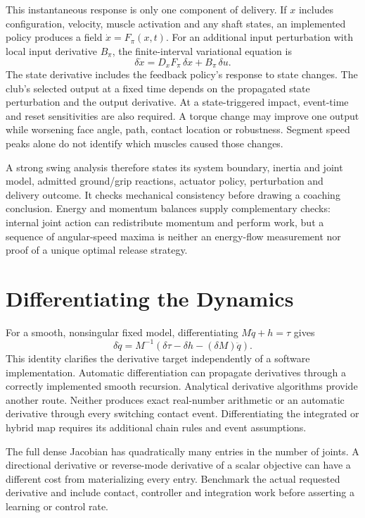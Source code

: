 This instantaneous response is only one component of delivery. If $x$ includes configuration, velocity, muscle activation and any shaft states, an implemented policy produces a field $\dot x=F_\pi(x,t)$. For an additional input perturbation with local input derivative $B_\pi$, the finite-interval variational equation is
\begin{equation}
 \delta\dot x=D_xF_\pi\,\delta x+B_\pi\,\delta u.
\end{equation}
The state derivative includes the feedback policy's response to state changes. The club's selected output at a fixed time depends on the propagated state perturbation and the output derivative. At a state-triggered impact, event-time and reset sensitivities are also required. A torque change may improve one output while worsening face angle, path, contact location or robustness. Segment speed peaks alone do not identify which muscles caused those changes.

A strong swing analysis therefore states its system boundary, inertia and joint model, admitted ground/grip reactions, actuator policy, perturbation and delivery outcome. It checks mechanical consistency before drawing a coaching conclusion. Energy and momentum balances supply complementary checks: internal joint action can redistribute momentum and perform work, but a sequence of angular-speed maxima is neither an energy-flow measurement nor proof of a unique optimal release strategy.

\section{Differentiating the Dynamics}

For a smooth, nonsingular fixed model, differentiating $M\ddot q+h=\tau$ gives
\begin{equation}
 \delta\ddot q=M^{-1}
 \left(\delta\tau-\delta h-(\delta M)\ddot q\right).
\end{equation}
This identity clarifies the derivative target independently of a software implementation. Automatic differentiation can propagate derivatives through a correctly implemented smooth recursion. Analytical derivative algorithms provide another route. Neither produces exact real-number arithmetic or an automatic derivative through every switching contact event. Differentiating the integrated or hybrid map requires its additional chain rules and event assumptions.

The full dense Jacobian has quadratically many entries in the number of joints. A directional derivative or reverse-mode derivative of a scalar objective can have a different cost from materializing every entry. Benchmark the actual requested derivative and include contact, controller and integration work before asserting a learning or control rate.

